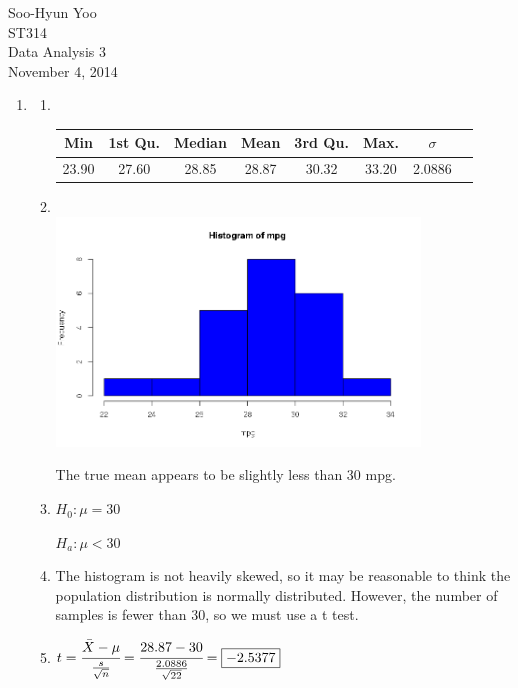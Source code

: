 \documentclass[12pt,letterpaper]{article}
\begin{document}
Soo-Hyun Yoo \\
ST314 \\
Data Analysis 3 \\
November 4, 2014

\begin{enumerate}
  \item
    \begin{enumerate}
      \item \hfill\\
        \begin{table}[!h]
          \centering
          \begin{tabular}{|c|c|c|c|c|c|c|c|} \hline
            Min & 1st Qu. & Median & Mean & 3rd Qu. & Max. & $\sigma$ \\ \hline
            23.90 & 27.60 & 28.85 & 28.87 & 30.32 & 33.20 & 2.0886 \\ \hline
          \end{tabular}
        \end{table}

      \item \hfill\\ \includegraphics[width=0.8\textwidth]{1b.png}

        The true mean appears to be slightly less than 30 mpg.

      \item $H_0: \mu = 30$

        $H_a: \mu < 30$

      \item The histogram is not heavily skewed, so it may be reasonable to
        think the population distribution is normally distributed. However, the
        number of samples is fewer than 30, so we must use a t test.

      \item $t = \cfrac{\bar{X} - \mu}{\frac{s}{\sqrt{n}}} = \cfrac{28.87 - 30}{\frac{2.0886}{\sqrt{22}}} = \boxed{-2.5377}$


\end{enumerate}
\end{enumerate}
\end{document}
